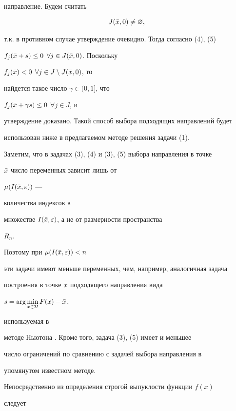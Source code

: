 направление. Будем считать


\begin{equation}


J(\Bar x,0)\ne\varnothing,


\end{equation}


т.к. в противном случае утверждение очевидно. Тогда согласно (4), (5)


$f_j(\Bar x+s)\le 0$ $\forall j\in J(\Bar x,0)$. Поскольку


$f_j(\Bar x)<0$ $\forall j\in J\setminus J(\Bar x,0)$, то


найдется такое число $\gamma\in(0,1]$, что


$f_j(\Bar x+\gamma s)\le 0$ $\forall j\in J$, и


утверждение доказано. Такой способ выбора подходящих направлений будет


использован ниже в предлагаемом методе решения задачи (1).





Заметим, что в задачах (3), (4) и (3), (5) выбора направления в точке


$\Bar x$ число переменных зависит лишь от


$\mu(I(\Bar x,\varepsilon))$ ---


количества индексов в


множестве $I(\Bar x,\varepsilon)$, а не от размерности пространства


$R_n$.


Поэтому при $\mu(I(\Bar x,\varepsilon))<n$


эти задачи имеют меньше переменных, чем, например, аналогичная задача


построения в точке $\Bar x$ подходящего направления вида


$s=\arg\min\limits_{x\in\cal D}F(x)-\Bar x$,


используемая в


методе Ньютона \cite{Vas}. Кроме того, задача (3), (5) имеет и меньшее


число ограничений по сравнению с задачей выбора направления в


упомянутом известном методе.





Непосредственно из определения строгой выпуклости функции $f(x)$


следует





